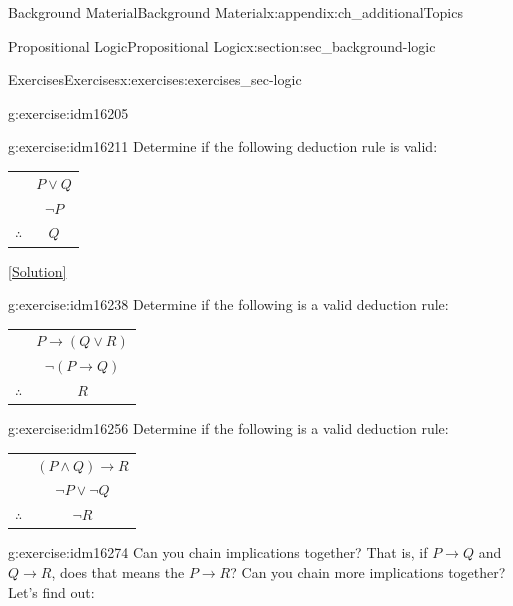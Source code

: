 \documentclass[oneside,10pt,]{book}
\numberwithin{equation}{chapter}
\newcommand{\hrulethin}  {\noalign{\hrule height 0.04em}}
\def\imp{\rightarrow}
\begin{document}
\begin{appendixptx}{Background Material}{}{Background Material}{}{}{x:appendix:ch_additionalTopics}
\begin{sectionptx}{Propositional Logic}{}{Propositional Logic}{}{}{x:section:sec_background-logic}
\begin{exercises-subsection}{Exercises}{}{Exercises}{}{}{x:exercises:exercises_sec-logic}
\begin{divisionexercise}{9}{}{}{g:exercise:idm16205}
\end{divisionexercise}%
\begin{divisionexercise}{10}{}{}{g:exercise:idm16211}%
Determine if the following deduction rule is valid:%
\begin{sidebyside}{1}{0}{0}{0}%
\begin{sbspanel}{1}%
{\centering%
\begin{tabular}{cc}
&\(P \vee Q\)\tabularnewline[0pt]
&\(\neg P\)\tabularnewline\hrulethin
\(\therefore\)&\(Q\)
\end{tabular}
\par}
\end{sbspanel}%
\end{sidebyside}%
\space\hspace*{0pt}\hfill{\tiny\hyperlink{g:solution:idm16229-main}{[Solution]}}\end{divisionexercise}%
\begin{divisionexercise}{11}{}{}{g:exercise:idm16238}%
Determine if the following is a valid deduction rule:%
\begin{sidebyside}{1}{0}{0}{0}%
\begin{sbspanel}{1}%
{\centering%
\begin{tabular}{cc}
&\(P \imp (Q \vee R)\)\tabularnewline[0pt]
&\(\neg(P \imp Q)\)\tabularnewline\hrulethin
\(\therefore\)&\(R\)
\end{tabular}
\par}
\end{sbspanel}%
\end{sidebyside}%
\end{divisionexercise}%
\begin{divisionexercise}{12}{}{}{g:exercise:idm16256}%
Determine if the following is a valid deduction rule:%
\begin{sidebyside}{1}{0}{0}{0}%
\begin{sbspanel}{1}%
{\centering%
\begin{tabular}{cc}
&\((P \wedge Q) \imp R\)\tabularnewline[0pt]
&\(\neg P \vee \neg Q\)\tabularnewline\hrulethin
\(\therefore\)&\(\neg R\)
\end{tabular}
\par}
\end{sbspanel}%
\end{sidebyside}%
\end{divisionexercise}%
\begin{divisionexercise}{13}{}{}{g:exercise:idm16274}%
Can you chain implications together? That is, if \(P \imp Q\) and \(Q \imp R\), does that means the \(P \imp R\)? Can you chain more implications together? Let's find out:%

\end{divisionexercise}
\end{exercises-subsection}
\end{sectionptx}
\end{appendixptx}
\end{document}
